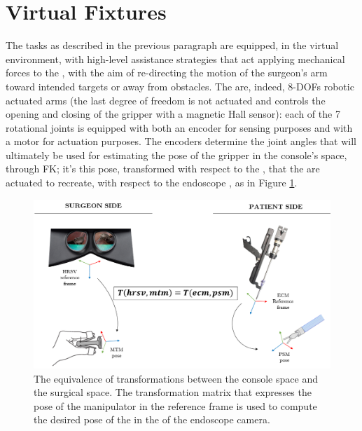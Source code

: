\documentclass[../main.tex]{subfiles}
\begin{document}
\section{Virtual Fixtures}
The tasks as described in the previous paragraph are equipped, in the virtual environment, with high-level assistance strategies that act applying mechanical forces to the \mtms, with the aim of re-directing the motion of the surgeon's arm toward intended targets or away from obstacles. The \mtms are, indeed, 8-DOFs robotic actuated arms (the last degree of freedom is not actuated and controls the opening and closing of the gripper with a magnetic Hall sensor): each of the 7 rotational joints is equipped with both an encoder for sensing purposes and with a motor for actuation purposes. The encoders determine the joint angles that will ultimately be used for estimating the pose of the gripper in the console's space, through FK; it's this pose, transformed with respect to the \hrsv \rf, that the \psms are actuated to recreate, with respect to the endoscope \rf, as in Figure \ref{fig:consoletocarttransform}. 

\begin{figure}[h]
    \centering
    \includegraphics[width=\textwidth]{images/console_to_cart_transform.png}
    \caption{The equivalence of transformations between the console space and the surgical space. The transformation matrix that expresses the pose of the manipulator in the \hrsv reference frame is used to compute the desired pose of the \psm in the \rf of the endoscope camera.}
    \label{fig:consoletocarttransform}
\end{figure}
\end{document}
